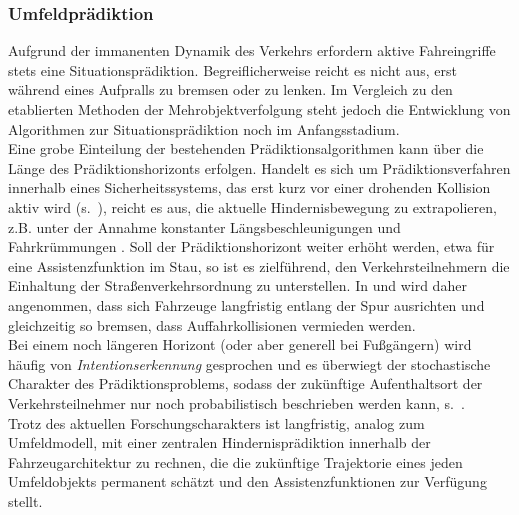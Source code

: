 
\subsubsection{Umfeldprädiktion} \label{sec:praediction}
Aufgrund der immanenten Dynamik des Verkehrs erfordern aktive Fahreingriffe stets eine Situationsprädiktion. Begreiflicherweise reicht es nicht aus, erst während eines Aufpralls zu bremsen oder zu lenken. Im Vergleich zu den etablierten Methoden der Mehrobjektverfolgung steht jedoch die Entwicklung von Algorithmen zur Situationsprädiktion noch im Anfangsstadium. \\
Eine grobe Einteilung der bestehenden Prädiktionsalgorithmen kann über die Länge des Prädiktionshorizonts erfolgen. Handelt es sich um Prädiktionsverfahren innerhalb eines Sicherheitssystems, das erst kurz vor einer drohenden Kollision aktiv wird (s.\ ), reicht es aus, die aktuelle Hindernisbewegung zu extrapolieren, z.B. unter der Annahme konstanter Längsbeschleunigungen und Fahrkrümmungen  \cite{Hillenbrand2006, Barth2008}. Soll der Prädiktionshorizont weiter erhöht werden, etwa für eine Assistenzfunktion im Stau, so ist es zielführend, den Verkehrsteilnehmern die Einhaltung der Straßenverkehrsordnung zu unterstellen. In \cite{ferguson2008detection, lawitzkyinteractive} und  wird daher angenommen, dass sich Fahrzeuge langfristig entlang der Spur ausrichten und gleichzeitig so bremsen, dass Auffahrkollisionen vermieden werden. \\
Bei einem noch längeren Horizont (oder aber generell bei Fußgängern) wird häufig von \emph{Intentionserkennung} gesprochen und es überwiegt der stochastische Charakter des Prädiktionsproblems, sodass der zukünftige Aufenthaltsort der Verkehrsteilnehmer nur noch probabilistisch beschrieben werden kann, s.\ \zB \cite{borger2013fahrerintentionserkennung, rohrmuller2008probabilistic, lefevre2012risk, gindele2010probabilistic, althoff2009model, Althoff2010}.\\
Trotz des aktuellen Forschungscharakters ist langfristig, analog zum Umfeldmodell, mit einer zentralen Hindernisprädiktion innerhalb der Fahrzeugarchitektur zu rechnen, die die zukünftige Trajektorie eines jeden Umfeldobjekts permanent schätzt und den Assistenzfunktionen zur Verfügung stellt.



